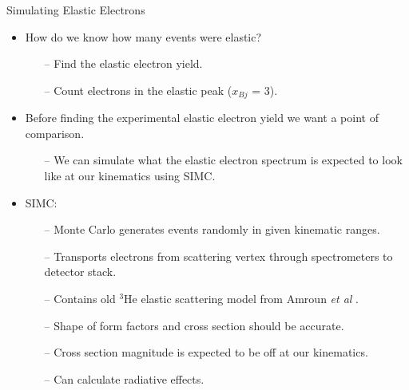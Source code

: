 \documentclass[10pt]{beamer}
\begin{document}
\begin{frame}[fragile]{Simulating Elastic Electrons}
	\begin{itemize}
		\item How do we know how \alert{many events were elastic}?
			\begin{itemize}
				\pause
				\item[--] Find the \alert{elastic electron yield}.
				\item[--] Count electrons in the elastic peak ($x_{Bj}$ = 3).
			\end{itemize}
		\pause
		\item Before finding the experimental elastic electron yield we want a \alert{point of comparison}.
			\begin{itemize}
				\pause
				\item[--] We can simulate what the elastic electron spectrum is expected to look like at our kinematics using \alert{SIMC}.
			\end{itemize}
		\pause	
		\item SIMC:
			\begin{itemize}
				\item[--] Monte Carlo \alert{generates events randomly} in given kinematic ranges.
				\item[--] \alert{Transports electrons} from scattering vertex through spectrometers to detector stack. 
				\item[--] Contains old \alert{$^3$He elastic scattering model} from Amroun \textit{et al} \cite{Article:Amroun}.
				\item[--] Shape of form factors and cross section should be accurate.
				\item[--] \alert{Cross section magnitude is expected to be off} at our kinematics.
				\item[--] Can calculate \alert{radiative effects}.
			\end{itemize}	 
	\end{itemize}
\end{frame}
\end{document}
